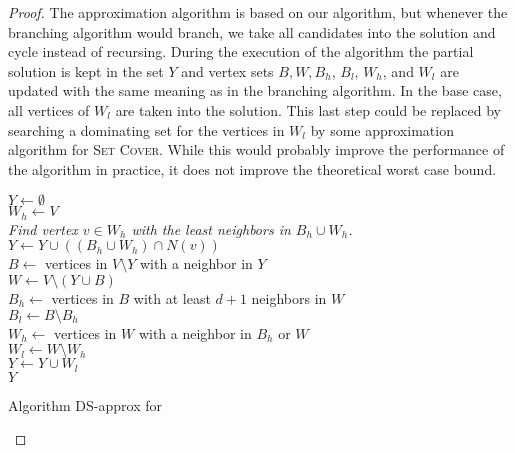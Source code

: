  \begin{proof}
The approximation algorithm is based on our {\FPT} algorithm, but whenever the branching algorithm would branch, we take all candidates into the solution and cycle instead of recursing. During the execution of the algorithm the partial solution is kept in the set $Y$ and vertex sets $B, W, B_h$, $B_l$, $W_h$, and $W_l$ are updated with the same meaning as in the branching algorithm. In the base case, all vertices of $W_l$ are taken into the solution. This last step could be replaced by searching a dominating set for the vertices in $W_l$ by some approximation algorithm for \textsc{Set Cover}. While this would probably improve the performance of the algorithm in practice, 
it does not 
improve the theoretical worst case bound.

\begin{algorithm}[t]
$Y \leftarrow \emptyset$\\
$W_h \leftarrow V$\\
{\emph{Find vertex $v\in W_h$ with the least neighbors in $B_h\cup W_h$.}\label{approx_algo:find}\\
$Y \leftarrow Y \cup ((B_h \cup W_h)\cap N(v))$\label{approx_algo:branch}\\
$B \leftarrow$ vertices in $V\setminus Y$ with a neighbor in $Y$\\
$W \leftarrow V \setminus (Y \cup B)$\\
$B_h \leftarrow$ vertices in $B$ with at least $d+1$ neighbors in $W$\\
$B_l \leftarrow B \setminus B_h$\\
$W_h \leftarrow$ vertices in $W$ with a neighbor in $B_h$ or $W$\\
$W_l \leftarrow W \setminus W_h$\\
}
$Y \leftarrow Y \cup W_l$\label{approx_algo:base}\\
\Return $Y$\\
\BlankLine
\caption{Algorithm {\sc DS-approx} for {\ds}}\label{algo:approx_domset}
\end{algorithm}


\end{proof}
